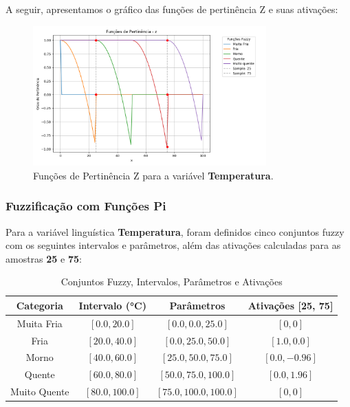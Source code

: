 \documentclass[a4paper,12pt]{article}
\begin{document}
A seguir, apresentamos o gráfico das funções de pertinência Z e suas ativações:

\begin{figure}[H]
    \centering
    \includegraphics[width=0.8\textwidth]{img/funções_de_pertinência_z_fuzzificado.png}
    \caption{Funções de Pertinência Z para a variável \textbf{Temperatura}.}
\end{figure}

\subsubsection{Fuzzificação com Funções Pi}

Para a variável linguística \textbf{Temperatura}, foram definidos cinco conjuntos fuzzy com os seguintes intervalos e parâmetros, além das ativações calculadas para as amostras \textbf{25} e \textbf{75}:

\begin{table}[H]
\centering
\caption{Conjuntos Fuzzy, Intervalos, Parâmetros e Ativações}
\begin{tabular}{|c|c|c|c|}
\hline
\textbf{Categoria}    & \textbf{Intervalo (°C)} & \textbf{Parâmetros}       & \textbf{Ativações [25, 75]} \\ \hline
Muita Fria            & $[0.0, 20.0]$          & $[0.0, 0.0, 25.0]$        & $[0, 0]$                   \\ \hline
Fria                  & $[20.0, 40.0]$         & $[0.0, 25.0, 50.0]$       & $[1.0, 0.0]$               \\ \hline
Morno                 & $[40.0, 60.0]$         & $[25.0, 50.0, 75.0]$      & $[0.0, -0.96]$             \\ \hline
Quente                & $[60.0, 80.0]$         & $[50.0, 75.0, 100.0]$     & $[0.0, 1.96]$              \\ \hline
Muito Quente          & $[80.0, 100.0]$        & $[75.0, 100.0, 100.0]$    & $[0, 0]$                   \\ \hline
\end{tabular}
\end{table}
\end{document}
